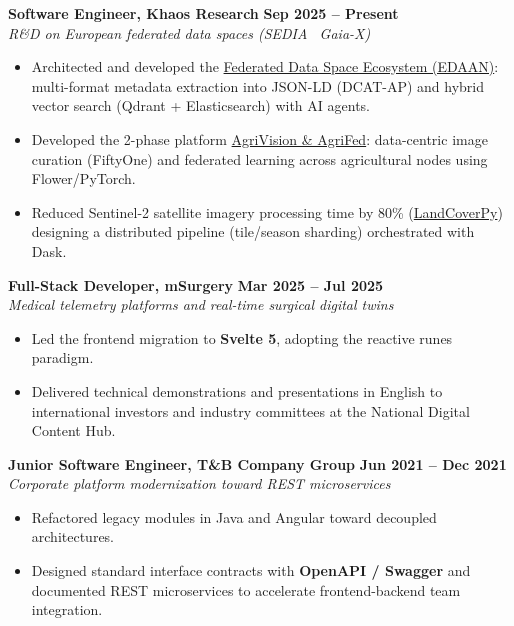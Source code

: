 \documentclass[a4paper,10pt]{article}
\begin{document}
\noindent\textbf{Software Engineer, Khaos Research} \hfill {\footnotesize\color{subtext}\textbf{Sep 2025 -- Present}} \\
{\footnotesize\color{subtext}\textit{R\&D on European federated data spaces (SEDIA \textbar\ Gaia-X)}}
\begin{itemize}
  \item Architected and developed the \href{https://diegodepablo.is-a.dev/projects/edaan-data-space}{Federated Data Space Ecosystem (EDAAN)}: multi-format metadata extraction into JSON-LD (DCAT-AP) and hybrid vector search (Qdrant + Elasticsearch) with AI agents.
  \item Developed the 2-phase platform \href{https://diegodepablo.is-a.dev/projects/agrivision-agrifed}{AgriVision \& AgriFed}: data-centric image curation (FiftyOne) and federated learning across agricultural nodes using Flower/PyTorch.
  \item Reduced Sentinel-2 satellite imagery processing time by 80\% (\href{https://diegodepablo.is-a.dev/projects/landcoverpy}{LandCoverPy}) designing a distributed pipeline (tile/season sharding) orchestrated with Dask.
\end{itemize}

\vspace{5pt}

\noindent\textbf{Full-Stack Developer, mSurgery} \hfill {\footnotesize\color{subtext}\textbf{Mar 2025 -- Jul 2025}} \\
{\footnotesize\color{subtext}\textit{Medical telemetry platforms and real-time surgical digital twins}}
\begin{itemize}
  \item Led the frontend migration to \textbf{Svelte 5}, adopting the reactive runes paradigm.
  \item Delivered technical demonstrations and presentations in English to international investors and industry committees at the National Digital Content Hub.
\end{itemize}

\vspace{5pt}

\noindent\textbf{Junior Software Engineer, T\&B Company Group} \hfill {\footnotesize\color{subtext}\textbf{Jun 2021 -- Dec 2021}} \\
{\footnotesize\color{subtext}\textit{Corporate platform modernization toward REST microservices}}
\begin{itemize}
  \item Refactored legacy modules in Java and Angular toward decoupled architectures.
  \item Designed standard interface contracts with \textbf{OpenAPI / Swagger} and documented REST microservices to accelerate frontend-backend team integration.
\end{itemize}
\end{document}

